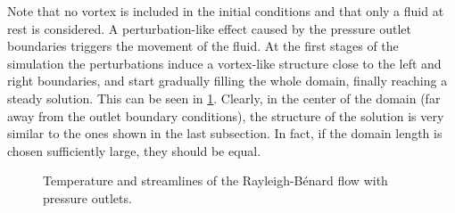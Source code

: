 Note that no vortex is included in the initial conditions and that only a fluid at rest is considered. A perturbation-like effect caused by the pressure outlet boundaries triggers the movement of the fluid. At the first stages of the simulation the perturbations induce a vortex-like structure close to the left and right boundaries, and start gradually filling the whole domain, finally reaching a steady solution. This can be seen in \cref{fig:RayBerUnsteadySol}. Clearly, in the center of the domain (far away from the outlet boundary conditions), the structure of the solution is very similar to the ones shown in the last subsection. In fact, if the domain length is chosen sufficiently large, they should be equal. 
\begin{figure}[t]
	\centering
	\pgfplotsset{width=0.96\textwidth, compat=1.3}
	\par\bigskip%
	\par\bigskip%
	\par\bigskip%
	\par\bigskip%
	\par\bigskip%
	\par\bigskip%
	\par\bigskip%
	\par\bigskip%
	\caption{Temperature and streamlines of the Rayleigh-Bénard flow with pressure outlets.}\label{fig:RayBerUnsteadySol}
\end{figure}
\FloatBarrier